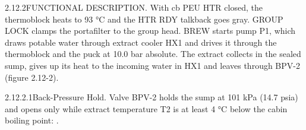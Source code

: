 \documentclass{nasa-handbook}
\begin{document}
\vspace{2.2mm}
\begin{nhpara}{2.12.2}{FUNCTIONAL DESCRIPTION.}
With cb PEU HTR closed, the thermoblock heats to 93 °C and the HTR RDY talkback goes gray. GROUP LOCK clamps the portafilter to the group head. BREW starts pump P1, which draws potable water through extract cooler HX1 and drives it through the thermoblock and the puck at 10.0 bar absolute. The extract collects in the sealed sump, gives up its heat to the incoming water in HX1 and leaves through BPV-2 (figure 2.12-2).
\end{nhpara}

\begin{nhsubpara}[6.8mm]{2.12.2.1}{Back-Pressure Hold.}
Valve BPV-2 holds the sump at 101 kPa (14.7 psia) and opens only while extract temperature T2 is at least 4 °C below the cabin boiling point: .
\end{nhsubpara}
\end{document}
